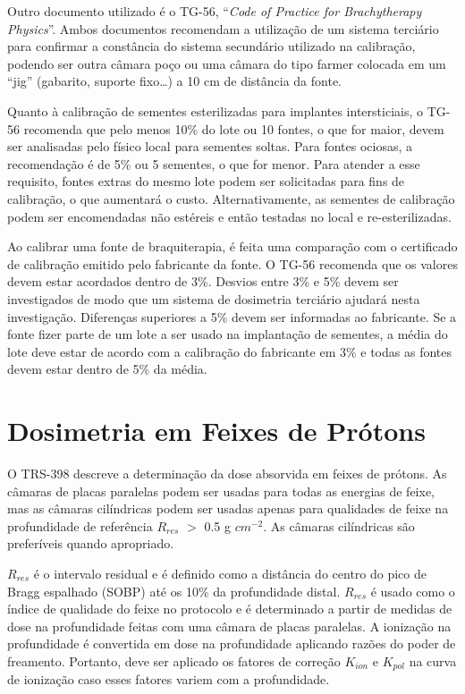 \documentclass[11pt,a4paper]{article}
\begin{document}
	Outro documento utilizado é o TG-56, ``\textit{Code of Practice for Brachytherapy Physics}''. Ambos documentos recomendam a utilização de um sistema terciário para confirmar a constância do sistema secundário utilizado na calibração, podendo ser outra câmara poço ou uma câmara do tipo farmer colocada em um ``jig'' (gabarito, suporte fixo\dots) a 10 cm de distância da fonte.

	Quanto à calibração de sementes esterilizadas para implantes intersticiais, o TG-56 recomenda que pelo menos 10\% do lote ou 10 fontes, o que for maior, devem ser analisadas pelo físico local para sementes soltas. Para fontes ociosas, a recomendação é de 5\% ou 5 sementes, o que for menor. Para atender a esse requisito, fontes extras do mesmo lote podem ser solicitadas para fins de calibração, o que aumentará o custo. Alternativamente, as sementes de calibração podem ser encomendadas não estéreis e então testadas no local e re-esterilizadas.

	Ao calibrar uma fonte de braquiterapia, é feita uma comparação com o certificado de calibração emitido pelo fabricante da fonte. O TG-56 recomenda que os valores devem estar acordados dentro de 3\%. Desvios entre 3\% e 5\% devem ser investigados de modo que um sistema de dosimetria terciário ajudará nesta investigação. Diferenças superiores a 5\% devem ser informadas ao fabricante. Se a fonte fizer parte de um lote a ser usado na implantação de sementes, a média do lote deve estar de acordo com a calibração do fabricante em 3\% e todas as fontes devem estar dentro de 5\% da média.

\section{Dosimetria em Feixes de Prótons}

	O TRS-398 descreve a determinação da dose absorvida em feixes de prótons. As câmaras de placas paralelas podem ser usadas para todas as energias de feixe, mas as câmaras cilíndricas podem ser usadas apenas para qualidades de feixe na profundidade de referência $R_{res}$ $>$ 0.5 g $cm^{-2}$. As câmaras cilíndricas são preferíveis quando apropriado. 
	
	$R_{res}$ é o intervalo residual e é definido como a distância do centro do pico de Bragg espalhado (SOBP) até os 10\% da profundidade distal. $R_{res}$ é usado como o índice de qualidade do feixe no protocolo e é determinado a partir de medidas de dose na profundidade feitas com uma câmara de placas paralelas. A ionização na profundidade é convertida em dose na profundidade aplicando razões do poder de freamento. Portanto, deve ser aplicado os fatores de correção $K_{ion}$ e $K_{pol}$ na curva de ionização caso esses fatores variem com a profundidade.
\end{document}
